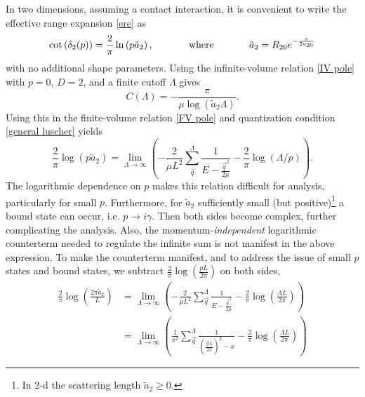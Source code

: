 In two dimensions, assuming a contact interaction, it is convenient to write the effective range expansion \eqref{ere} as
\begin{equation}\label{eq:2d contact phase shift}
    \cot \left(\delta_{2}(p)\right)
    =
    \frac{2}{\pi} \ln \left(p \tilde a_{2}\right),
%
    \hspace{0.5in}
    \text{where}
    \hspace{0.5in}
%
    \tilde a_{2}
    =
    R_{20}e^{-\frac{\pi}{2 a_{20}}}
\end{equation}
with no additional shape parameters.
Using the infinite-volume relation \eqref{IV pole} with $p=0$, $D=2$, and a finite cutoff $\Lambda$ gives
\begin{equation}\label{eq:C2}
    C(\Lambda)
    =
    -\frac{\pi}{\mu \log \left(\tilde a_{2} \Lambda\right)}.
\end{equation}
Using this in the finite-volume relation \eqref{FV pole} and quantization condition \eqref{general luscher} yields
\begin{equation}\label{eq:first 2d}
    \frac{2}{\pi} \log \left(p\tilde a_{2}\right)
    =
    \lim_{\Lambda\to\infty}
    \left(
        -\frac{2}{\mu L^{2}} \sum_{\vec{q}}^{\Lambda} \frac{1}{E-\frac{\vec{q}^{2}}{2\mu}}
        -\frac{2}{\pi} \log (\Lambda / p)
    \right).
\end{equation}
The logarithmic dependence on $p$ makes this relation difficult for analysis, particularly for small $p$.
Furthermore, for $\tilde a_{2}$ sufficiently small (but positive)\footnote{
    In 2-d the scattering length $\tilde a_{2}\ge 0$\cite{}.
} a bound state can occur, i.e. $p\to i\gamma$.
Then both sides become complex, further complicating the analysis.
Also, the momentum-\emph{independent} logarithmic counterterm needed to regulate the infinite sum is not manifest in the above expression.
To make the counterterm manifest, and to address the issue of small $p$ states and bound states, we subtract $\frac{2}{\pi}\log\left(\frac{pL}{2\pi}\right)$ on both sides,
\begin{align}
    \frac{2}{\pi} \log \left(\frac{2\pi \tilde a_{2}}{L}\right)
    &=
    \lim_{\Lambda\to\infty}
    \left(
        -\frac{2}{\mu L^{2}} \sum_{\vec{q}}^{\Lambda} \frac{1}{E-\frac{\vec{q}^{2}}{2\mu}}
        -\frac{2}{\pi} \log \left(\frac{\Lambda L}{2\pi}\right)
    \right)
    \nonumber\\
    &=
    \lim_{\Lambda\to\infty}
    \left(
        \frac{1}{\pi^2} \sum_{\vec{q}}^{\Lambda} \frac{1}{\left(\frac{\vec{q}L}{2\pi}\right)^2-x}-\frac{2}{\pi} \log \left(\frac{\Lambda L}{2\pi}\right)
    \right)
    \label{eq:second 2d}
\end{align}
